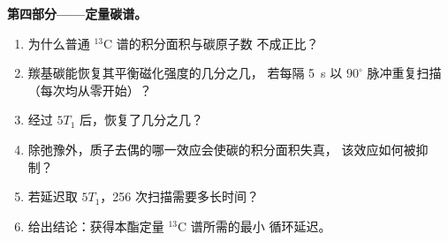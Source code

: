 \begin{problem}
\medskip\noindent\textbf{第四部分——定量碳谱。}
\begin{enumerate}[resume]
  \item 为什么普通 ${}^{13}$C 谱的积分面积与碳原子数
        不成正比？
  \item 羰基碳能恢复其平衡磁化强度的几分之几，
        若每隔 \qty{5}{s} 以 $90^\circ$ 脉冲重复扫描
        （每次均从零开始）？
  \item 经过 $5T_1$ 后，恢复了几分之几？
  \item 除弛豫外，质子去偶的哪一效应会使碳的积分面积失真，
        该效应如何被抑制？
  \item 若延迟取 $5T_1$，256 次扫描需要多长时间？
  \item 给出结论：获得本酯定量 ${}^{13}$C 谱所需的最小
        循环延迟。
\end{enumerate}
\end{problem}
